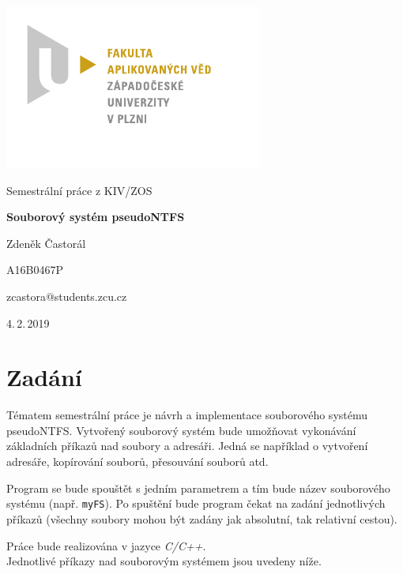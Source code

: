 \documentclass[
11pt,
a4paper,
pdftex,
czech,
titlepage
]{report}
\begin{document}
\begin{titlepage}
	{\centering\includegraphics[scale=1.2]{logo-FAV.pdf}\par}
	\centering
	\vspace*{2.5cm}
	{\Large Semestrální práce z KIV/ZOS\par}
	\vspace{1.5cm}
	{\Huge\bfseries Souborový systém pseudoNTFS\par}
	\vspace{2.5cm}

	{\Large Zdeněk Častorál\par}
	{\Large A16B0467P\par}
	{\Large zcastora@students.zcu.cz\par}

	\vfill

	{\Large 4.\,2.\,2019}
\end{titlepage}

\tableofcontents
\thispagestyle{empty}
\clearpage

\chapter{Zadání}\label{intro}
\setcounter{page}{3}
Tématem semestrální práce je návrh a implementace souborového systému pseudoNTFS. Vytvořený souborový systém bude umožňovat vykonávání základních příkazů nad soubory a adresáři. Jedná se například o vytvoření adresáře, kopírování souborů, přesouvání souborů atd.

Program se bude spouštět s jedním parametrem a tím bude název souborového systému (např. \texttt{myFS}). Po spuštění bude program čekat na zadání jednotlivých příkazů (všechny soubory mohou být zadány jak absolutní, tak relativní cestou).

Práce bude realizována v jazyce \textit{C/C++}.\\[0.5\baselineskip]
\noindent Jednotlivé příkazy nad souborovým systémem jsou uvedeny níže.
\end{document}
